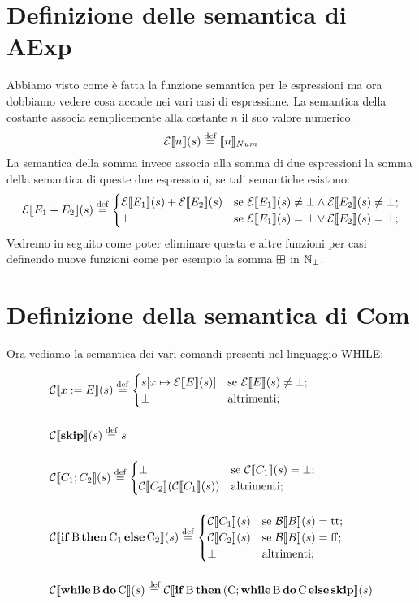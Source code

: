 \section{Definizione delle semantica di AExp} 
Abbiamo visto come è fatta la funzione semantica per le espressioni ma ora dobbiamo vedere cosa accade nei vari casi di espressione. La semantica della costante associa semplicemente alla costante $n$ il suo valore numerico.
$$ \denot{\calE}{n}{s} \defeq \llbracket n \rrbracket_{Num}$$
La semantica della somma invece associa alla somma di due espressioni la somma della semantica di queste due espressioni, se tali semantiche esistono:
$$ \denot{\calE}{E_1 + E_2}{s} \defeq \begin{cases}
	\denot{\calE}{E_1}{s} + \denot{\calE}{E_2}{s} & \text{se } \denot{\calE}{E_1}{s} \neq \bot \land \denot{\calE}{E_2}{s} \neq \bot;\\
	\bot & \text{se } \denot{\calE}{E_1}{s} = \bot \lor \denot{\calE}{E_2}{s} = \bot;\\
	\end{cases}
$$
Vedremo in seguito come poter eliminare questa e altre funzioni per casi definendo nuove funzioni come per esempio la somma $\mathbin{\boxplus}$ in $\mathbb{N}_\bot$.

\section{Definizione della semantica di Com} 
Ora vediamo la semantica dei vari comandi presenti nel linguaggio WHILE:

\begin{align*}
&\denot{\calC}{x \weq E}{s} \defeq \begin{cases}
	\assign{s}{x}{\denot{\calE}{E}{s}} & \text{se } \denot{\calE}{E}{s} \neq \bot;\\
	\bot & \text{altrimenti};
	\end{cases}
\pts
&\denot{\calC}{\kw{skip}}{s} \defeq s
\pts
&\denot{\calC}{C_1 ; C_2}{s} \defeq \begin{cases}
	\bot & \text{se } \denot{\calC}{C_1}{s} = \bot;\\
	\denot{\calC}{C_2}{\denot{\calC}{C_1}{s}} & \text{altrimenti};\\
	\end{cases}
\pts
&\denot{\calC}{\condif{B}{C_1}{C_2}}{s} \defeq \begin{cases}
	\denot{\calC}{C_1}{s} & \text{se } \denot{\calB}{B}{s} = \ttv ;\\
	\denot{\calC}{C_2}{s} & \text{se } \denot{\calB}{B}{s} = \ffv ;\\
	\bot & \text{altrimenti};
	\end{cases}
\pts
&\denot{\calC}{\while{B}{C}}{s} \defeq \denot{\calC}{\condif{B}{(C ; \while{B}{C}}{\kw{skip}}}{s}
\end{align*}

